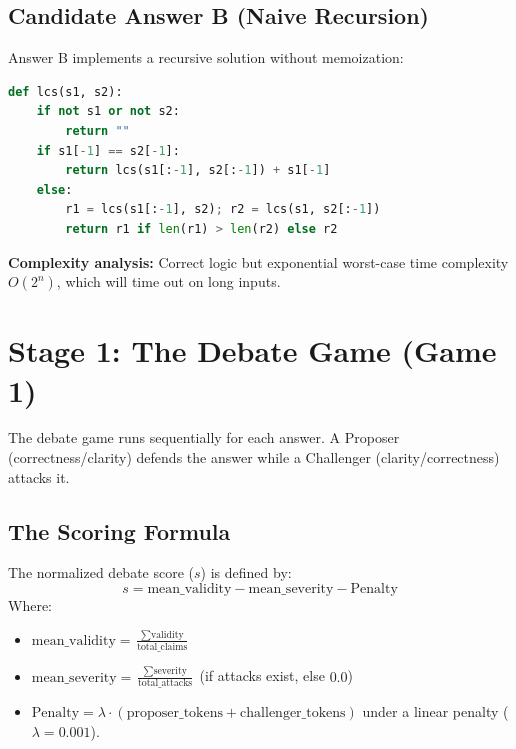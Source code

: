 \documentclass[11pt]{article}
\begin{document}
\subsection{Candidate Answer B (Naive Recursion)}
Answer B implements a recursive solution without memoization:
\begin{lstlisting}[language=Python]
def lcs(s1, s2):
    if not s1 or not s2:
        return ""
    if s1[-1] == s2[-1]:
        return lcs(s1[:-1], s2[:-1]) + s1[-1]
    else:
        r1 = lcs(s1[:-1], s2); r2 = lcs(s1, s2[:-1])
        return r1 if len(r1) > len(r2) else r2
\end{lstlisting}
\textbf{Complexity analysis:} Correct logic but exponential worst-case time complexity $O(2^n)$, which will time out on long inputs.

\newpage

\section{Stage 1: The Debate Game (Game 1)}
The debate game runs sequentially for each answer. A Proposer (correctness/clarity) defends the answer while a Challenger (clarity/correctness) attacks it.

\subsection{The Scoring Formula}
The normalized debate score ($s$) is defined by:
\begin{equation}
s = \text{mean\_validity} - \text{mean\_severity} - \text{Penalty}
\end{equation}
Where:
\begin{itemize}
    \item $\text{mean\_validity} = \frac{\sum \text{validity}}{\text{total\_claims}}$
    \item $\text{mean\_severity} = \frac{\sum \text{severity}}{\text{total\_attacks}}$ (if attacks exist, else $0.0$)
    \item $\text{Penalty} = \lambda \cdot (\text{proposer\_tokens} + \text{challenger\_tokens})$ under a linear penalty ($\lambda = 0.001$).
\end{itemize}
\end{document}
